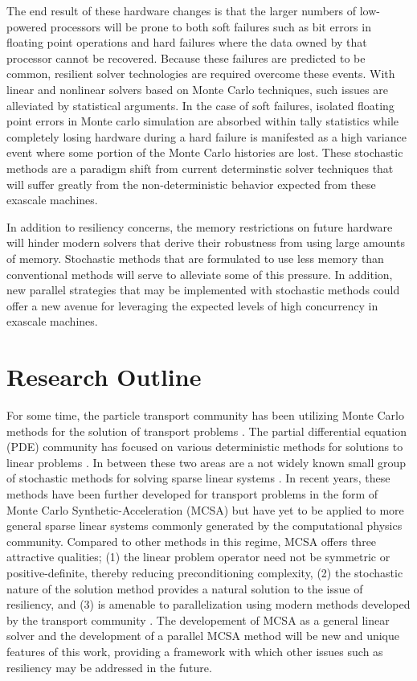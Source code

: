 The end result of these hardware changes is that the larger numbers of
low-powered processors will be prone to both soft failures such as bit
errors in floating point operations and hard failures where the data
owned by that processor cannot be recovered. Because these failures
are predicted to be common, resilient solver technologies are required
overcome these events. With linear and nonlinear solvers based on
Monte Carlo techniques, such issues are alleviated by statistical
arguments. In the case of soft failures, isolated floating point
errors in Monte carlo simulation are absorbed within tally statistics
while completely losing hardware during a hard failure is manifested
as a high variance event where some portion of the Monte Carlo
histories are lost. These stochastic methods are a paradigm shift from
current determinstic solver techniques that will suffer greatly from
the non-deterministic behavior expected from these exascale machines.

In addition to resiliency concerns, the memory restrictions on future
hardware will hinder modern solvers that derive their robustness from
using large amounts of memory. Stochastic methods that are formulated
to use less memory than conventional methods will serve to alleviate
some of this pressure. In addition, new parallel strategies that may
be implemented with stochastic methods could offer a new avenue for
leveraging the expected levels of high concurrency in exascale
machines.

\section{Research Outline}
\label{sec:research_outline}
For some time, the particle transport community has been utilizing
Monte Carlo methods for the solution of transport problems
\citep{lewis_computational_1993}. The partial differential equation
(PDE) community has focused on various deterministic methods for
solutions to linear problems \citep{saad_iterative_2003,
  kelley_iterative_1995}. In between these two areas are a not widely
known small group of stochastic methods for solving sparse linear
systems \citep{forsythe_matrix_1950, hammersley_monte_1964,
  halton_sequential_1962, halton_sequential_1994}. In recent years,
these methods have been further developed for transport problems in
the form of Monte Carlo Synthetic-Acceleration (MCSA)
\citep{evans_residual_2003, evans_monte_2009, evans_monte_2012} but
have yet to be applied to more general sparse linear systems commonly
generated by the computational physics community. Compared to other
methods in this regime, MCSA offers three attractive qualities; (1)
the linear problem operator need not be symmetric or
positive-definite, thereby reducing preconditioning complexity, (2)
the stochastic nature of the solution method provides a natural
solution to the issue of resiliency, and (3) is amenable to
parallelization using modern methods developed by the transport
community \citep{wagner_hybrid_2010}. The developement of MCSA as a
general linear solver and the development of a parallel MCSA method
will be new and unique features of this work, providing a framework
with which other issues such as resiliency may be addressed in the
future.

